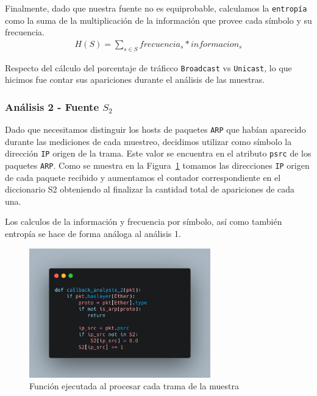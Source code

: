 Finalmente, dado que nuestra fuente no es equiprobable, calculamos la \texttt{entropía} como la suma de la multiplicación de la información que provee cada símbolo y su frecuencia.
\begin{equation} \label{eq24}
\begin{split}
H(S) = {\sum_{s \in S}frecuencia_{s} * informacion_{s}}
\end{split}
\end{equation}

Respecto del cálculo del porcentaje de tráficco \texttt{Broadcast} vs \texttt{Unicast}, lo que hicimos fue contar sus apariciones durante el análisis de las muestras.

\subsubsection{Análisis 2 - Fuente $S_{2}$}
Dado que necesitamos distinguir los hosts de paquetes \texttt{ARP} que habían aparecido durante las mediciones de cada muestreo, decidimos utilizar como símbolo la dirección \texttt{IP} origen de la trama. Este valor se encuentra en el atributo \texttt{psrc} de los paquetes \texttt{ARP}. Como se muestra en la Figura~\ref{code: callback_2} tomamos las direcciones \texttt{IP} origen de cada paquete recibido y aumentamos el contador correspondiente en el diccionario S2 obteniendo al finalizar la cantidad total de apariciones de cada una.

Los calculos de la información y frecuencia por símbolo, así como también entropía se hace de forma análoga al análisis 1.

\begin{figure}[H]
    \includegraphics[width=0.7\textwidth]{images/resultados_generales/codigo_analisis_2.png}\vspace{1em}
    \centering
    \caption{Función ejecutada al procesar cada trama de la muestra}
    \label{code: callback_2}
\end{figure}

